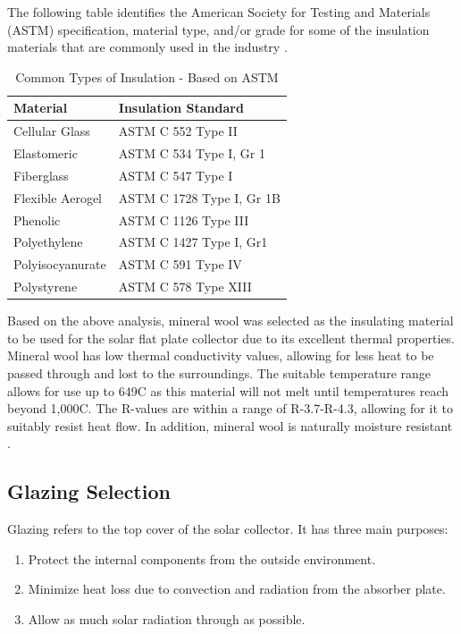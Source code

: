 \medskip
The following table identifies the American Society for Testing and Materials (ASTM) specification, material type, and/or grade for some of the insulation materials that are commonly used in the industry \cite{insulation_design}.

\medskip
\begin{table}[H]
\centering
\caption{Common Types of Insulation - Based on ASTM}
\begin{tabular}{|P{50mm}|P{50mm}|}
    \hline
    Material & Insulation Standard \\
    \hline
    Cellular Glass   & ASTM C 552 Type II        \\
    Elastomeric      & ASTM C 534 Type I, Gr 1   \\
    Fiberglass       & ASTM C 547 Type I         \\
    Flexible Aerogel & ASTM C 1728 Type I, Gr 1B \\
    Phenolic         & ASTM C 1126 Type III      \\
    Polyethylene     & ASTM C 1427 Type I, Gr1   \\
    Polyisocyanurate & ASTM C 591 Type IV        \\
    Polystyrene      & ASTM C 578 Type XIII      \\
    \hline
\end{tabular}
\end{table}

\medskip
Based on the above analysis, mineral wool was selected as the insulating material to be used for the solar flat plate collector due to its excellent thermal properties. Mineral wool has low thermal conductivity values, allowing for less heat to be passed through and lost to the surroundings. The suitable temperature range allows for use up to 649\textdegree C as this material will not melt until temperatures reach beyond 1,000\textdegree C. The R-values are within a range of R-3.7-R-4.3, allowing for it to suitably resist heat flow. In addition, mineral wool is naturally moisture resistant \cite{mineral_wool}.

\newpage
\subsection{Glazing Selection}

Glazing refers to the top cover of the solar collector. It has three main purposes:

\medskip
\begin{enumerate}[itemsep=3mm, parsep=-1mm, label=\roman*.]
    \item Protect the internal components from the outside environment.
    \item Minimize heat loss due to convection and radiation from the absorber plate.
    \item Allow as much solar radiation through as possible.
\end{enumerate}

